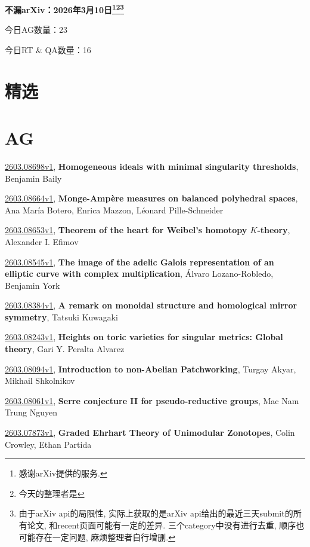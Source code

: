 \documentclass[9pt, a4paper]{article}
\theoremstyle{plain}
\theoremstyle{definition}
\theoremstyle{remark}
\newcommand{\arxiv}[3]{\href{https://arxiv.org/abs/#1}{#1}, \textbf{\textcolor{arxivblue}{#2}}, #3}
\newcommand{\AGnumber}{23}
\newcommand{\RTQAnumber}{16}
\newcommand{\NewestDate}{2026年3月10日}
\newcommand{\todayarXiver}{} %
\begin{document}
\begin{center}
    \Huge\textbf{不漏arXiv：\NewestDate\footnote{感谢arXiv提供的服务.}\footnote{今天的整理者是\todayarXiver}\footnote{由于arXiv api的局限性, 实际上获取的是arXiv api给出的最近三天submit的所有论文, 和recent页面可能有一定的差异. 三个category中没有进行去重, 顺序也可能存在一定问题, 麻烦整理者自行增删.}} \\
\end{center}

\setcounter{section}{-1}

\begin{center}
    今日AG数量：\AGnumber
    
    今日RT \& QA数量：\RTQAnumber
    
\end{center}


\section{精选}


\section{AG}
\arxiv{2603.08698v1}{Homogeneous ideals with minimal singularity thresholds}{Benjamin Baily}

\arxiv{2603.08664v1}{Monge-Ampère measures on balanced polyhedral spaces}{Ana María Botero, Enrica Mazzon, Léonard Pille-Schneider}

\arxiv{2603.08653v1}{Theorem of the heart for Weibel's homotopy $K$-theory}{Alexander I. Efimov}

\arxiv{2603.08545v1}{The image of the adelic Galois representation of an elliptic curve with complex multiplication}{Álvaro Lozano-Robledo, Benjamin York}

\arxiv{2603.08384v1}{A remark on monoidal structure and homological mirror symmetry}{Tatsuki Kuwagaki}

\arxiv{2603.08243v1}{Heights on toric varieties for singular metrics: Global theory}{Gari Y. Peralta Alvarez}

\arxiv{2603.08094v1}{Introduction to non-Abelian Patchworking}{Turgay Akyar, Mikhail Shkolnikov}

\arxiv{2603.08061v1}{Serre conjecture II for pseudo-reductive groups}{Mac Nam Trung Nguyen}

\arxiv{2603.07873v1}{Graded Ehrhart Theory of Unimodular Zonotopes}{Colin Crowley, Ethan Partida}
\end{document}
